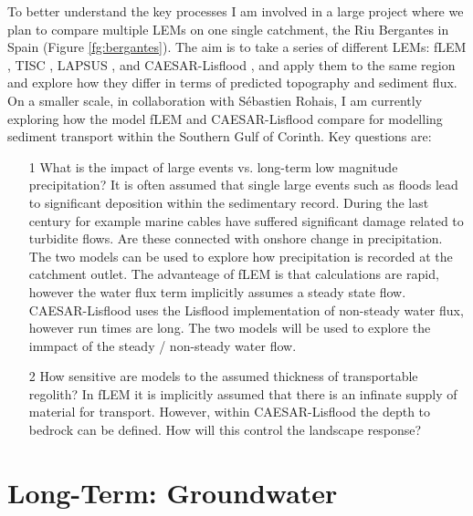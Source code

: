 To better understand the key processes I am involved in a large project where we plan to compare multiple LEMs on one single catchment, the Riu Bergantes in Spain (Figure \ref{fg:bergantes}). The aim is to take a series of different LEMs: fLEM \citep{armitage-2019}, TISC \citep{garcia-castellanos-2002}, LAPSUS \citep{schoorl-etal-2000}, and CAESAR-Lisflood \citep{coulthard-etal-2013}, and apply them to the same region and explore how they differ in terms of predicted topography and sediment flux. On a smaller scale, in collaboration with Sébastien Rohais, I am currently exploring how the model fLEM and CAESAR-Lisflood compare for modelling sediment transport within the Southern Gulf of Corinth. Key questions are:
\begin{itemize}
    \item[1] What is the impact of large events vs. long-term low magnitude precipitation? It is often assumed that single large events such as floods lead to significant deposition within the sedimentary record. During the last century for example marine cables have suffered significant damage related to turbidite flows. Are these connected with onshore change in precipitation. The two models can be used to explore how precipitation is recorded at the catchment outlet. The advanteage of fLEM is that calculations are rapid, however the water flux term implicitly assumes a steady state flow. CAESAR-Lisflood uses the Lisflood implementation of non-steady water flux, however run times are long. The two models will be used to explore the immpact of the steady / non-steady water flow.
    \item[2] How sensitive are models to the assumed thickness of transportable regolith? In fLEM it is implicitly assumed that there is an infinate supply of material for transport. However, within CAESAR-Lisflood the depth to bedrock can be defined. How will this control the landscape response?
\end{itemize}
  

\section{Long-Term: Groundwater}

